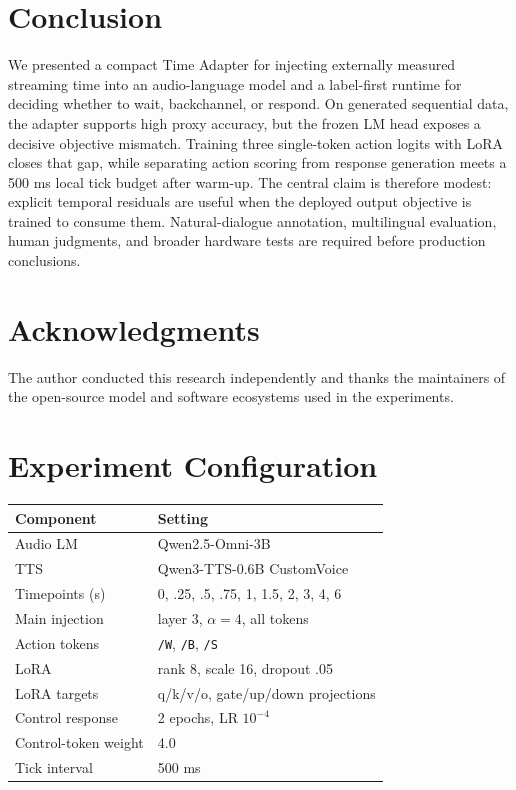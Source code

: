 \documentclass[10pt,twocolumn]{article}
\newcommand{\code}[1]{\texttt{#1}}
\begin{document}
\section{Conclusion}

We presented a compact Time Adapter for injecting externally measured streaming time into an audio-language model and a label-first runtime for deciding whether to wait, backchannel, or respond. On generated sequential data, the adapter supports high proxy accuracy, but the frozen LM head exposes a decisive objective mismatch. Training three single-token action logits with LoRA closes that gap, while separating action scoring from response generation meets a 500 ms local tick budget after warm-up. The central claim is therefore modest: explicit temporal residuals are useful when the deployed output objective is trained to consume them. Natural-dialogue annotation, multilingual evaluation, human judgments, and broader hardware tests are required before production conclusions.

\section*{Acknowledgments}

The author conducted this research independently and thanks the maintainers of the open-source model and software ecosystems used in the experiments.




\appendix
\section{Experiment Configuration}

\begin{center}
\small
\begin{tabular}{ll}
\toprule
Component & Setting\\
\midrule
Audio LM & Qwen2.5-Omni-3B\\
TTS & Qwen3-TTS-0.6B CustomVoice\\
Timepoints (s) & 0, .25, .5, .75, 1, 1.5, 2, 3, 4, 6\\
Main injection & layer 3, $\alpha=4$, all tokens\\
Action tokens & \code{/W}, \code{/B}, \code{/S}\\
LoRA & rank 8, scale 16, dropout .05\\
LoRA targets & q/k/v/o, gate/up/down projections\\
Control response & 2 epochs, LR $10^{-4}$\\
Control-token weight & 4.0\\
Tick interval & 500 ms\\
\bottomrule
\end{tabular}
\end{center}
\end{document}

